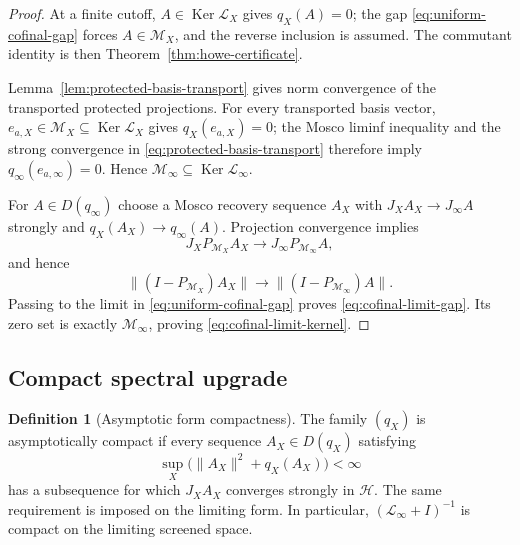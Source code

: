 \documentclass[11pt]{article}
\numberwithin{equation}{section}
\theoremstyle{definition}
\newtheorem{definition}[theorem]{Definition}
\theoremstyle{remark}
\newcommand{\Ker}{\operatorname{Ker}}
\newcommand{\norm}[1]{\lVert#1\rVert}
\newcommand{\M}{\mathcal M}
\begin{document}
\begin{proof}
At a finite cutoff, $A\in\Ker\mathscr L_X$ gives $q_X(A)=0$; the gap
\eqref{eq:uniform-cofinal-gap} forces $A\in\M_X$, and the reverse inclusion is
assumed.  The commutant identity is then
Theorem~\ref{thm:howe-certificate}.

Lemma~\ref{lem:protected-basis-transport} gives norm convergence of the
transported protected projections.  For every transported basis vector,
$e_{a,X}\in\M_X\subseteq\Ker\mathscr L_X$ gives $q_X(e_{a,X})=0$; the Mosco
liminf inequality and the strong convergence in
\eqref{eq:protected-basis-transport} therefore imply
$q_\infty(e_{a,\infty})=0$.  Hence
$\M_\infty\subseteq\Ker\mathscr L_\infty$.

For $A\in D(q_\infty)$ choose a Mosco recovery sequence $A_X$ with
$J_XA_X\to J_\infty A$ strongly and
$q_X(A_X)\to q_\infty(A)$.  Projection convergence implies
\[
 J_XP_{\M_X}A_X\longrightarrow
 J_\infty P_{\M_\infty}A,
\]
and hence
\[
 \|(I-P_{\M_X})A_X\|
 \longrightarrow\|(I-P_{\M_\infty})A\|.
\]
Passing to the limit in \eqref{eq:uniform-cofinal-gap} proves
\eqref{eq:cofinal-limit-gap}.  Its zero set is exactly $\M_\infty$, proving
\eqref{eq:cofinal-limit-kernel}.
\end{proof}


\subsection{Compact spectral upgrade}

\begin{definition}[Asymptotic form compactness]
\label{def:asymptotic-compactness}
The family $(q_X)$ is asymptotically compact if every sequence
$A_X\in D(q_X)$ satisfying
\begin{equation}
\sup_X\bigl(\norm{A_X}^2+q_X(A_X)\bigr)<\infty
\label{eq:asymptotic-compactness}
\end{equation}
has a subsequence for which $J_XA_X$ converges strongly in $\mathscr H$.
The same requirement is imposed on the limiting form.  In particular,
$(\mathscr L_\infty+I)^{-1}$ is compact on the limiting screened space.
\end{definition}
\end{document}

